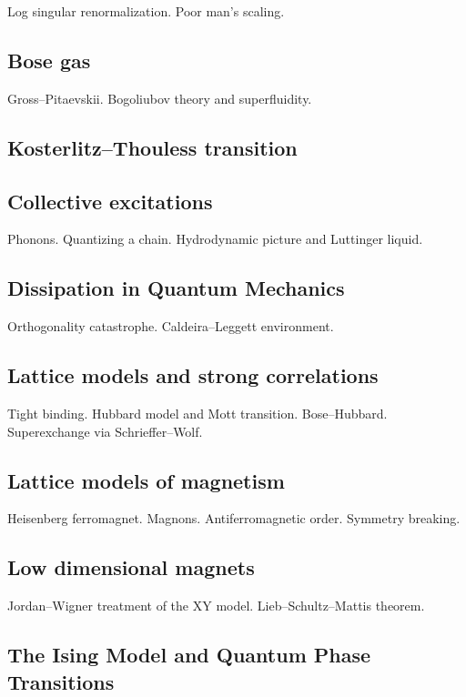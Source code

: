 Log singular renormalization. Poor man's scaling.

\subsection{Bose gas}

Gross--Pitaevskii. Bogoliubov theory and superfluidity.

\subsection{Kosterlitz--Thouless transition}

\subsection{Collective excitations}

Phonons. Quantizing a chain. Hydrodynamic picture and Luttinger liquid.

\subsection{Dissipation in Quantum Mechanics}

Orthogonality catastrophe. Caldeira--Leggett environment.

\subsection{Lattice models and strong correlations}

Tight binding. Hubbard model and Mott transition. Bose--Hubbard. Superexchange via Schrieffer--Wolf.

\subsection{Lattice models of magnetism}

Heisenberg ferromagnet. Magnons. Antiferromagnetic order. Symmetry breaking.

\subsection{Low dimensional magnets}

Jordan--Wigner treatment of the XY model. Lieb--Schultz--Mattis theorem.

\subsection{The Ising Model and Quantum Phase Transitions}

